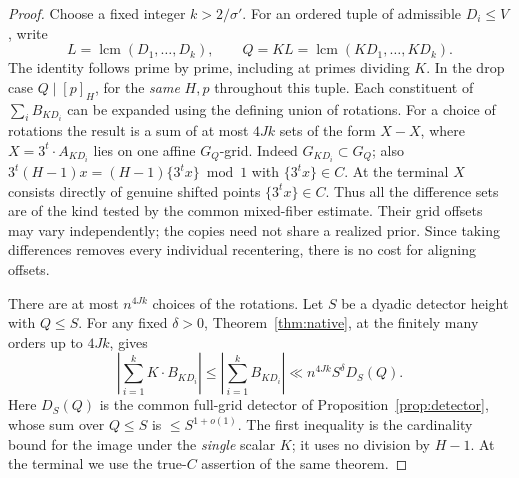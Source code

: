 \begin{proof}
Choose a fixed integer \(k>2/\sigma'\). For an ordered tuple of
admissible \(D_i\le V\), write
\[
 L=\operatorname{lcm}(D_1,\ldots,D_k),\qquad
 Q=K L=\operatorname{lcm}(KD_1,\ldots,KD_k).
\]
The identity follows prime by prime, including at primes dividing
\(K\). In the drop case \(Q\mid[p]_H\), for the \emph{same}
\(H,p\) throughout this tuple. Each constituent of
\(\sum_i B_{KD_i}\) can be expanded using the defining union of
rotations. For a choice of rotations the result is a sum of at
most \(4Jk\) sets of the form \(X-X\), where \(X=3^t\cdot A_{KD_i}\)
lies on one affine \(G_Q\)-grid. Indeed \(G_{KD_i}\subset G_Q\);
also \(3^t(H-1)x=(H-1)\{3^t x\}\bmod1\) with
\(\{3^t x\}\in C\). At the terminal \(X\) consists directly of
genuine shifted points \(\{3^t x\}\in C\). Thus all the difference
sets are of the kind tested by the common mixed-fiber estimate.
Their grid offsets may vary independently; the copies need not
share a realized prior. Since taking differences removes every
individual recentering, there is no cost for aligning offsets.

There are at most \(n^{4Jk}\) choices of the rotations. Let \(S\)
be a dyadic detector height with \(Q\le S\). For any fixed
\(\delta>0\), Theorem~\ref{thm:native},
at the finitely many orders up to \(4Jk\), gives
\begin{equation}\label{eq:lift-lcm}
 \left|\sum_{i=1}^k K\cdot B_{KD_i}\right|
 \le \left|\sum_{i=1}^k B_{KD_i}\right|
 \ll n^{4Jk} S^\delta D_S(Q).
\end{equation}
Here \(D_S(Q)\) is the common full-grid detector of
Proposition~\ref{prop:detector}, whose sum over
\(Q\le S\) is \(\le S^{1+o(1)}\). The first inequality is the
cardinality bound for the image under the \emph{single} scalar
\(K\); it uses no division by \(H-1\). At the terminal we use the
true-\(C\) assertion of the same theorem.


\end{proof}

